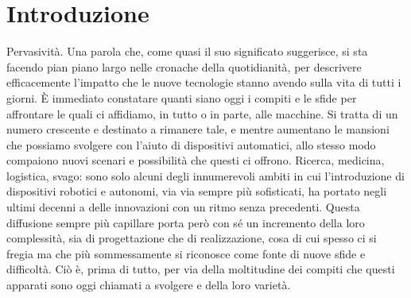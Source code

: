 
\chapter[Introduzione]{Introduzione}
\label{chap:Chapter1}
\doublespacing
\fontsize{14}{14}\selectfont

\indent Pervasività. Una parola che, come quasi il suo significato suggerisce, si sta facendo pian piano largo nelle cronache della quotidianità, per descrivere efficacemente l'impatto che le nuove tecnologie stanno avendo sulla vita di tutti i giorni. È immediato constatare quanti siano oggi i compiti e le sfide per affrontare le quali ci affidiamo, in tutto o in parte, alle macchine. Si tratta di un numero crescente e destinato a rimanere tale, e mentre aumentano le mansioni che possiamo svolgere con l'aiuto di dispositivi automatici, allo stesso modo compaiono nuovi scenari e possibilità che questi ci offrono. Ricerca, medicina, logistica, svago: sono solo alcuni degli innumerevoli ambiti in cui l'introduzione di dispositivi robotici e autonomi, via via sempre più sofisticati, ha portato negli ultimi decenni a delle innovazioni con un ritmo senza precedenti. Questa diffusione sempre più capillare porta però con sé un incremento della loro complessità, sia di progettazione che di realizzazione, cosa di cui spesso ci si fregia ma che più sommessamente si riconosce come fonte di nuove sfide e difficoltà. Ciò è, prima di tutto, per via della moltitudine dei compiti che questi apparati sono oggi chiamati a svolgere e della loro varietà.\\
